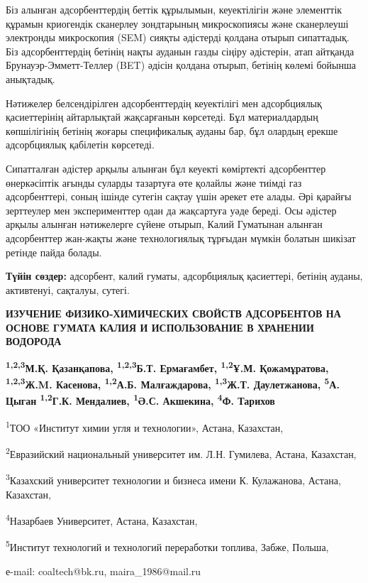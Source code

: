 Біз алынған адсорбенттердің беттік құрылымын, кеуектілігін және
элементтік құрамын криогендік сканерлеу зондтарының микроскопиясы және
сканерлеуші электронды микроскопия (SEM) сияқты әдістерді қолдана отырып
сипаттадық. Біз адсорбенттердің бетінің нақты ауданын газды сіңіру
әдістерін, атап айтқанда Брунауэр-Эмметт-Теллер (BET) әдісін қолдана
отырып, бетінің көлемі бойынша анықтадық.

Нәтижелер белсендірілген адсорбенттердің кеуектілігі мен адсорбциялық
қасиеттерінің айтарлықтай жақсарғанын көрсетеді. Бұл материалдардың
көпшілігінің бетінің жоғары спецификалық ауданы бар, бұл олардың ерекше
адсорбциялық қабілетін көрсетеді.

Сипатталған әдістер арқылы алынған бұл кеуекті көміртекті адсорбенттер
өнеркәсіптік ағынды суларды тазартуға өте қолайлы және тиімді газ
адсорбенттері, соның ішінде сутегін сақтау үшін әрекет ете алады. Әрі
қарайғы зерттеулер мен эксперименттер одан да жақсартуға уәде береді.
Осы әдістер арқылы алынған нәтижелерге сүйене отырып, Калий Гуматынан
алынған адсорбенттер жан-жақты және технологиялық тұрғыдан мүмкін
болатын шикізат ретінде пайда болады.

{\bfseries Түйін сөздер:} адсорбент, калий гуматы, адсорбциялық қасиеттері,
бетінің ауданы, активтенуі, сақталуы, сутегі.

\begin{articleheader}
{\bfseries ИЗУЧЕНИЕ ФИЗИКО-ХИМИЧЕСКИХ СВОЙСТВ АДСОРБЕНТОВ НА ОСНОВЕ ГУМАТА КАЛИЯ И ИСПОЛЬЗОВАНИЕ В ХРАНЕНИИ ВОДОРОДА}

{\bfseries
\textsuperscript{1,2,3}М.Қ. Қазанқапова\textsuperscript{\envelope },
\textsuperscript{1,2,3}Б.Т. Ермағамбет,
\textsuperscript{1,2}Ұ.М. Қожамұратова,
\textsuperscript{1,2,3}Ж.M. Касенова,
\textsuperscript{1,2}А.Б. Малғаждарова,
\textsuperscript{1,3}Ж.Т. Даулетжанова,
\textsuperscript{5}А. Цыган
\textsuperscript{1,2}Г.К. Мендалиев,
\textsuperscript{1}Ә.С. Акшекина,
\textsuperscript{4}Ф. Тарихов
}
\end{articleheader}

\begin{affiliation}
\textsuperscript{1}ТОО «Институт химии угля и технологии», Астана, Казахстан,

\textsuperscript{2}Евразийский национальный университет им. Л.Н. Гумилева, Астана, Казахстан,

\textsuperscript{3}Казахский университет технологии и бизнеса имени К. Кулажанова, Астана, Казахстан,

\textsuperscript{4}Назарбаев Университет, Астана, Казахстан,

\textsuperscript{5}Институт технологий и технологий переработки топлива, Забже, Польша,

е-mail: coaltech@bk.ru, maira\_1986@mail.ru
\end{affiliation}

